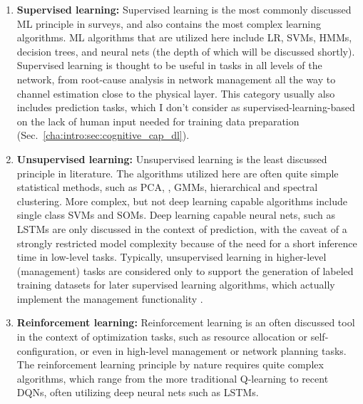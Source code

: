 			\begin{enumerate}[label=\textbf{\alph*})]
				\item \textbf{Supervised learning:}
				Supervised learning is the most commonly discussed \ac{ML} principle in surveys, and also contains the most complex learning algorithms.
				\ac{ML} algorithms that are utilized here include \ac{LR}, \acp{SVM}, \acp{HMM}, decision trees, and neural nets (the depth of which will be discussed shortly).
				Supervised learning is thought to be useful in tasks in all levels of the network, from root-cause analysis in network management all the way to channel estimation close to the physical layer.		
				This category usually also includes prediction tasks, which I don't consider as supervised-learning-based on the lack of human input needed for training data preparation (Sec.~\ref{cha:intro:sec:cognitive_cap_dl}).
				
				\item \textbf{Unsupervised learning:}
				Unsupervised learning is the least discussed principle in literature.
				The algorithms utilized here are often quite simple statistical methods, such as \ac{PCA}, \kmeans{}, \acp{GMM}, hierarchical and spectral clustering.
				More complex, but not deep learning capable algorithms include single class \acp{SVM} and \acp{SOM}.
				Deep learning capable neural nets, such as \acp{LSTM} are only discussed in the context of prediction, with the caveat of a strongly restricted model complexity because of the need for a short inference time in low-level tasks.
				Typically, unsupervised learning in higher-level (management) tasks are considered only to support the generation of labeled training datasets for later supervised learning algorithms, which actually implement the management functionality \cite{ai_for_5g}.
				
				\item \textbf{Reinforcement learning:}
				Reinforcement learning is an often discussed tool in the context of optimization tasks, such as resource allocation or self-configuration, or even in high-level management or network planning tasks.
				The reinforcement learning principle by nature requires quite complex algorithms, which range from the more traditional Q-learning to recent \acp{DQN}, often utilizing deep neural nets such as \acp{LSTM}.
			\end{enumerate}	
		
			
